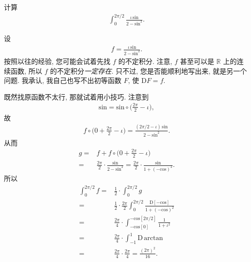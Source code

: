 \begin{example}
    计算
    \begin{align*}
        \int_{0}^{2\pi/2} {\frac{\iota \, \mathrm{sin}}{2 - \mathrm{sin}^2}}.
    \end{align*}

    设
    \begin{align*}
        f = \frac{\iota \, \mathrm{sin}}{2 - \mathrm{sin}^2}.
    \end{align*}
    按照以往的经验, 您可能会试着先找 $f$ 的不定积分. 注意, $f$ 甚至可以是 $\mathbb{R}$ 上的连续函数, 所以 $f$ 的不定积分\emph{一定存在}. 只不过, 您是否能顺利地写出来, 就是另一个问题. 我承认, 我自己也写不出初等函数 $F$, 使 $\mathrm{D}F = f$.

    既然找原函数不太行, 那就试着用小技巧. 注意到
    \begin{align*}
        \mathrm{sin} = \mathrm{sin} \circ \bigg( \frac{2\pi}{2} - \iota \bigg),
    \end{align*}
    故
    \begin{align*}
        f \circ \bigg(0 + \frac{2\pi}{2} - \iota \bigg) = \frac{(2\pi/2 - \iota) \, \mathrm{sin}}{2 - \mathrm{sin}^2}.
    \end{align*}
    从而
    \begin{align*}
        g
        = {} & f + f \circ \bigg(0 + \frac{2\pi}{2} - \iota \bigg)          \\
        = {} & \frac{2\pi}{2} \cdot \frac{\mathrm{sin}}{2 - \mathrm{sin}^2}
        = \frac{2\pi}{2} \cdot \frac{\mathrm{sin}}{1 + (-\mathrm{cos})^2}.
    \end{align*}
    所以
    \begin{align*}
        \int_{0}^{2\pi/2} {f}
        = {} & \frac{1}{2} \cdot \int_{0}^{2\pi/2} {g}                          \\
        = {} & \frac{1}{2} \cdot \frac{2\pi}{2} \int_{0}^{2\pi/2}
        {\frac{\mathrm{D}[-\mathrm{cos}]}{1 + (-\mathrm{cos})^2}}               \\
        = {} & \frac{2\pi}{4} \cdot
        \int_{-\mathrm{cos}[0]}^{-\mathrm{cos}[2\pi/2]}
        {\frac{1}{1 + \iota^2}}                                                 \\
        = {} & \frac{2\pi}{4} \cdot \int_{-1}^{1} {\mathrm{D}\,\mathrm{arctan}} \\
        = {} & \frac{2\pi}{4} \cdot \frac{2\pi}{4}
        = \frac{(2\pi)^2}{16}.
    \end{align*}
\end{example}
